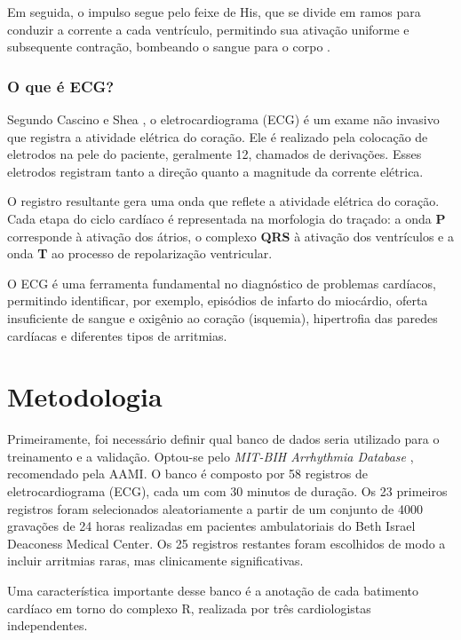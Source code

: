 \documentclass[
    12pt,                %
    openright,           %
    oneside,             %
    a4paper,             %
    brazil               %
]{abntex2}
\begin{document}
Em seguida, o impulso segue pelo feixe de His, que se divide em ramos para conduzir a corrente a cada ventrículo, permitindo sua ativação uniforme e subsequente contração, bombeando o sangue para o corpo \cite{msd_ecg}.

\subsection{O que é ECG?}

Segundo Cascino e Shea \cite{msd_ecg}, o eletrocardiograma (ECG) é um exame não invasivo que registra a atividade elétrica do coração. 
Ele é realizado pela colocação de eletrodos na pele do paciente, geralmente 12, chamados de derivações. 
Esses eletrodos registram tanto a direção quanto a magnitude da corrente elétrica. 

O registro resultante gera uma onda que reflete a atividade elétrica do coração. 
Cada etapa do ciclo cardíaco é representada na morfologia do traçado: 
a onda \textbf{P} corresponde à ativação dos átrios, 
o complexo \textbf{QRS} à ativação dos ventrículos 
e a onda \textbf{T} ao processo de repolarização ventricular.  

O ECG é uma ferramenta fundamental no diagnóstico de problemas cardíacos, 
permitindo identificar, por exemplo, episódios de infarto do miocárdio, 
oferta insuficiente de sangue e oxigênio ao coração (isquemia), 
hipertrofia das paredes cardíacas e diferentes tipos de arritmias.

\chapter{Metodologia}

Primeiramente, foi necessário definir qual banco de dados seria utilizado para o treinamento e a validação. Optou-se pelo \textit{MIT-BIH Arrhythmia Database} \cite{mitbih2005}, recomendado pela AAMI. O banco é composto por 58 registros de eletrocardiograma (ECG), cada um com 30 minutos de duração. Os 23 primeiros registros foram selecionados aleatoriamente a partir de um conjunto de 4000 gravações de 24 horas realizadas em pacientes ambulatoriais do Beth Israel Deaconess Medical Center. Os 25 registros restantes foram escolhidos de modo a incluir arritmias raras, mas clinicamente significativas.

Uma característica importante desse banco é a anotação de cada batimento cardíaco em torno do complexo R, realizada por três cardiologistas independentes.
\end{document}
